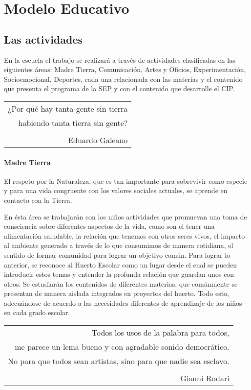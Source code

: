 \documentclass[10pt,letterpaper,oneside]{book}
\makeatletter
\newenvironment{myepigraph}
  {\par\hfill\itshape
   \begin{tabular}{@{}r@{\hspace{2em}}}} %
  {\end{tabular}\par\medskip}
\makeatother
\begin{document}
\chapter{Modelo Educativo}
\section{Las actividades}
En la escuela el trabajo se realizará a través de actividades clasificadas en las siguientes áreas: Madre Tierra, Comunicación, Artes y Oficios, Experimentación, Socioemocional, Deportes, cada una relacionada con las materias y el contenido que presenta el programa de la SEP y con el contenido que desarrolle el CIP. 

\vspace{0.5cm}
\begin{myepigraph}¿Por qué hay tanta gente sin tierra\\
habiendo tanta tierra sin gente?\vspace{0.1cm}\\
\\
Eduardo Galeano
\end{myepigraph}
\subsubsection{Madre Tierra}
El respeto por la Naturaleza, que es tan importante para sobrevivir como especie y para una vida congruente con los valores sociales actuales, se aprende en contacto con la Tierra. 

En ésta área se trabajarán con los niños actividades que promuevan una toma de consciencia sobre diferentes aspectos de la vida, como son el tener una alimentación saludable, la relación que tenemos con otros seres vivos, el impacto al ambiente generado a través de lo que consumimos de manera cotidiana, el sentido de formar comunidad para lograr un objetivo común. Para lograr lo anterior, se reconoce al Huerto Escolar como un lugar desde el cual se pueden introducir estos temas y entender la profunda relación que guardan unos con otros. Se estudiarán los contenidos de diferentes materias,  que comúnmente se presentan de manera aislada integrados en proyectos del huerto.  Todo esto, adecuándose de acuerdo a las necesidades diferentes de aprendizaje de los niños en cada grado escolar.
 
\vspace{0.5cm}
\begin{myepigraph} Todos los usos de la palabra para todos,\\
me parece un lema bueno y con agradable sonido democrático.\\
No para que todos sean artistas, sino para que nadie sea esclavo.\\
\vspace{0.1cm}\\
Gianni Rodari
\end{myepigraph}
\end{document}

